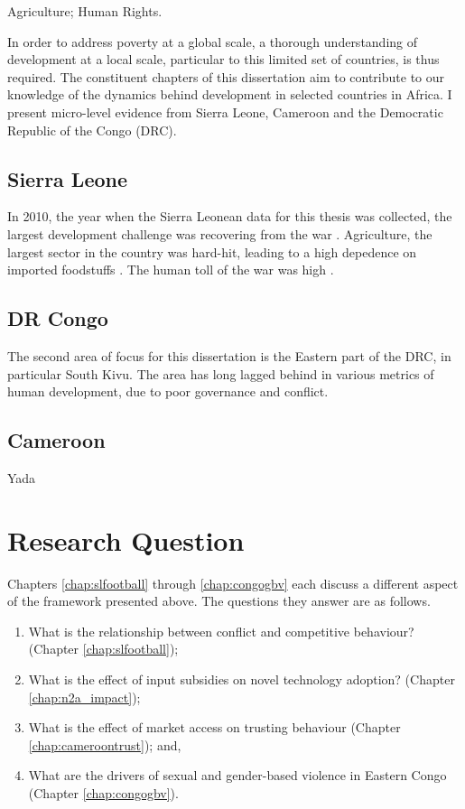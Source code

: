Agriculture; Human Rights.

In order to address poverty at a global scale, a thorough understanding of development at a local scale, particular to this limited set of countries, is thus required. The constituent chapters of this dissertation aim to contribute to our knowledge of the dynamics behind development in selected countries in Africa. I present micro-level evidence from Sierra Leone, Cameroon and the Democratic Republic of the Congo (DRC). %

\subsection{Sierra Leone}
In 2010, the year when the Sierra Leonean data for this thesis was collected, the largest development challenge was recovering from the war . Agriculture, the largest sector in the country was hard-hit, leading to a high depedence on imported foodstuffs \citep{FAO2005}. The human toll of the war was high .


\subsection{DR Congo}
The second area of focus for this dissertation is the Eastern part of the DRC, in particular South Kivu. The area has long lagged behind in various metrics of human development, due to poor governance and conflict.

\subsection{Cameroon}
Yada

\section{Research Question}
Chapters \ref{chap:slfootball} through \ref{chap:congogbv} each discuss a different aspect of the framework presented above. The questions they answer are as follows.
\begin{enumerate}
	\item What is the relationship between conflict and competitive behaviour? (Chapter \ref{chap:slfootball});
	\item What is the effect of input subsidies on novel technology adoption? (Chapter \ref{chap:n2a_impact});
	\item What is the effect of market access on trusting behaviour (Chapter \ref{chap:cameroontrust}); and,
	\item What are the drivers of sexual and gender-based violence in Eastern Congo (Chapter \ref{chap:congogbv}).
\end{enumerate}



